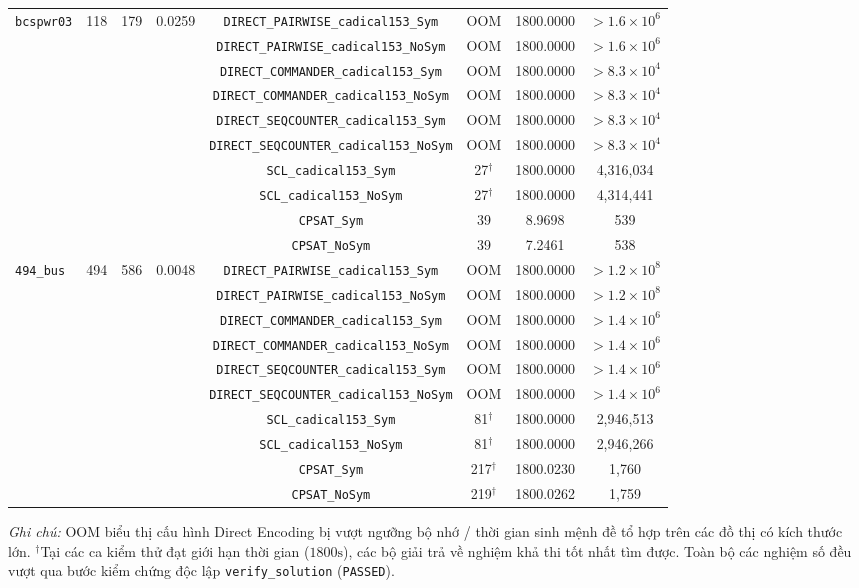 \documentclass[a4paper,fleqn]{cas-sc}
\begin{document}
\begin{table}[pos=p]
\begin{tabular}{lccccccc}
\midrule
\texttt{bcspwr03} & 118 & 179 & 0.0259 & \texttt{DIRECT\_PAIRWISE\_cadical153\_Sym} & OOM & 1800.0000 & $> 1.6 \times 10^6$ \\
 & & & & \texttt{DIRECT\_PAIRWISE\_cadical153\_NoSym} & OOM & 1800.0000 & $> 1.6 \times 10^6$ \\
 & & & & \texttt{DIRECT\_COMMANDER\_cadical153\_Sym} & OOM & 1800.0000 & $> 8.3 \times 10^4$ \\
 & & & & \texttt{DIRECT\_COMMANDER\_cadical153\_NoSym} & OOM & 1800.0000 & $> 8.3 \times 10^4$ \\
 & & & & \texttt{DIRECT\_SEQCOUNTER\_cadical153\_Sym} & OOM & 1800.0000 & $> 8.3 \times 10^4$ \\
 & & & & \texttt{DIRECT\_SEQCOUNTER\_cadical153\_NoSym} & OOM & 1800.0000 & $> 8.3 \times 10^4$ \\
 & & & & \texttt{SCL\_cadical153\_Sym} & 27$^\dagger$ & 1800.0000 & 4,316,034 \\
 & & & & \texttt{SCL\_cadical153\_NoSym} & 27$^\dagger$ & 1800.0000 & 4,314,441 \\
 & & & & \texttt{CPSAT\_Sym} & 39 & 8.9698 & 539 \\
 & & & & \texttt{CPSAT\_NoSym} & 39 & 7.2461 & 538 \\
\midrule
\texttt{494\_bus} & 494 & 586 & 0.0048 & \texttt{DIRECT\_PAIRWISE\_cadical153\_Sym} & OOM & 1800.0000 & $> 1.2 \times 10^8$ \\
 & & & & \texttt{DIRECT\_PAIRWISE\_cadical153\_NoSym} & OOM & 1800.0000 & $> 1.2 \times 10^8$ \\
 & & & & \texttt{DIRECT\_COMMANDER\_cadical153\_Sym} & OOM & 1800.0000 & $> 1.4 \times 10^6$ \\
 & & & & \texttt{DIRECT\_COMMANDER\_cadical153\_NoSym} & OOM & 1800.0000 & $> 1.4 \times 10^6$ \\
 & & & & \texttt{DIRECT\_SEQCOUNTER\_cadical153\_Sym} & OOM & 1800.0000 & $> 1.4 \times 10^6$ \\
 & & & & \texttt{DIRECT\_SEQCOUNTER\_cadical153\_NoSym} & OOM & 1800.0000 & $> 1.4 \times 10^6$ \\
 & & & & \texttt{SCL\_cadical153\_Sym} & 81$^\dagger$ & 1800.0000 & 2,946,513 \\
 & & & & \texttt{SCL\_cadical153\_NoSym} & 81$^\dagger$ & 1800.0000 & 2,946,266 \\
 & & & & \texttt{CPSAT\_Sym} & 217$^\dagger$ & 1800.0230 & 1,760 \\
 & & & & \texttt{CPSAT\_NoSym} & 219$^\dagger$ & 1800.0262 & 1,759 \\
\bottomrule
\end{tabular}
\par\vspace{0.5ex}
\raggedright\textit{Ghi chú:} OOM biểu thị cấu hình Direct Encoding bị vượt ngưỡng bộ nhớ / thời gian sinh mệnh đề tổ hợp trên các đồ thị có kích thước lớn. $^\dagger$Tại các ca kiểm thử đạt giới hạn thời gian ($1800\text{s}$), các bộ giải trả về nghiệm khả thi tốt nhất tìm được. Toàn bộ các nghiệm số đều vượt qua bước kiểm chứng độc lập \texttt{verify\_solution} (\texttt{PASSED}).
\end{table}
\clearpage
\end{document}
